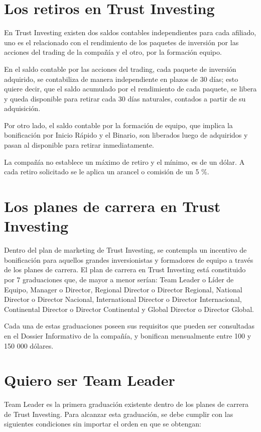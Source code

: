 \documentclass[12pt,letterpaper]{article}
\begin{document}
   \section{Los retiros en Trust Investing}
   En Trust Investing existen dos saldos contables independientes para cada afiliado, uno es el relacionado con el rendimiento de los paquetes de inversión por las acciones del trading de la compañía y el otro, por la formación equipo. 
   
   En el saldo contable por las acciones del trading, cada paquete de inversión adquirido, se contabiliza de manera independiente en plazos de 30 días; esto quiere decir, que el saldo acumulado por el rendimiento de cada paquete, se libera y queda disponible para retirar cada 30 días naturales, contados a partir de su adquisición. 
   
   Por otro lado, el saldo contable por la formación de equipo, que implica la bonificación por Inicio Rápido y el Binario, son liberados luego de adquiridos y pasan al disponible para retirar inmediatamente. 
   
   La compañía no establece un máximo de retiro y el mínimo, es de un dólar. A cada retiro solicitado se le aplica un arancel o comisión de un 5 \%.
   
   \section{Los planes de carrera en Trust Investing}
   Dentro del plan de marketing de Trust Investing, se contempla un incentivo de bonificación para aquellos grandes inversionistas y formadores de equipo a través de los planes de carrera. El plan de carrera en Trust Investing está constituido por 7 graduaciones que, de mayor a menor serían: Team Leader o Líder de Equipo, Manager o Director, Regional Director o Director Regional, National Director o Director Nacional, International Director o Director Internacional, Continental Director o Director Continental y Global Director o Director Global.
   
   Cada una de estas graduaciones poseen sus requisitos que pueden ser consultadas en el Dossier Informativo de la compañía, y bonifican mensualmente entre 100 y 150 000 dólares.
   
   \section{Quiero ser Team Leader}
   Team Leader es la primera graduación existente dentro de los planes de carrera de Trust Investing. Para alcanzar esta graduación, se debe cumplir con las siguientes condiciones sin importar el orden en que se obtengan:
   
\end{document}
